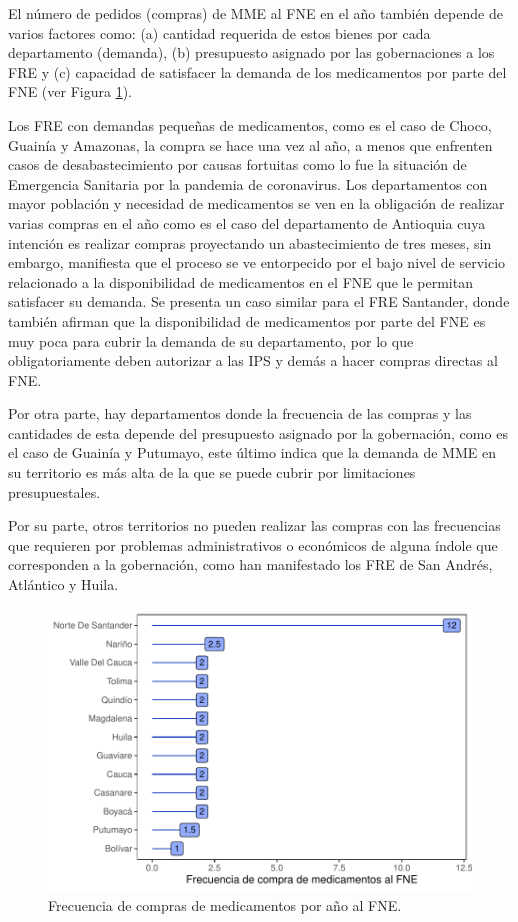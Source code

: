 \documentclass[
  oneside]{book}
\begin{document}
El número de pedidos (compras) de MME al FNE en el año también depende de varios factores como: (a) cantidad requerida de estos bienes por cada departamento (demanda), (b) presupuesto asignado por las gobernaciones a los FRE y (c) capacidad de satisfacer la demanda de los medicamentos por parte del FNE (ver Figura \ref{fig:FrecComprasFNR}).

Los FRE con demandas pequeñas de medicamentos, como es el caso de Choco, Guainía y Amazonas, la compra se hace una vez al año, a menos que enfrenten casos de desabastecimiento por causas fortuitas como lo fue la situación de Emergencia Sanitaria por la pandemia de coronavirus. Los departamentos con mayor población y necesidad de medicamentos se ven en la obligación de realizar varias compras en el año como es el caso del departamento de Antioquia cuya intención es realizar compras proyectando un abastecimiento de tres meses, sin embargo, manifiesta que el proceso se ve entorpecido por el bajo nivel de servicio relacionado a la disponibilidad de medicamentos en el FNE que le permitan satisfacer su demanda. Se presenta un caso similar para el FRE Santander, donde también afirman que la disponibilidad de medicamentos por parte del FNE es muy poca para cubrir la demanda de su departamento, por lo que obligatoriamente deben autorizar a las IPS y demás a hacer compras directas al FNE.

Por otra parte, hay departamentos donde la frecuencia de las compras y las cantidades de esta depende del presupuesto asignado por la gobernación, como es el caso de Guainía y Putumayo, este último indica que la demanda de MME en su territorio es más alta de la que se puede cubrir por limitaciones presupuestales.

Por su parte, otros territorios no pueden realizar las compras con las frecuencias que requieren por problemas administrativos o económicos de alguna índole que corresponden a la gobernación, como han manifestado los FRE de San Andrés, Atlántico y Huila.

\begin{figure}[t]

{\centering \includegraphics[width=0.9\linewidth]{InformeFinal_files/figure-latex/FrecComprasFNR-1} 

}

\caption{Frecuencia de compras de medicamentos por año al FNE.}\label{fig:FrecComprasFNR}
\end{figure}
\end{document}

